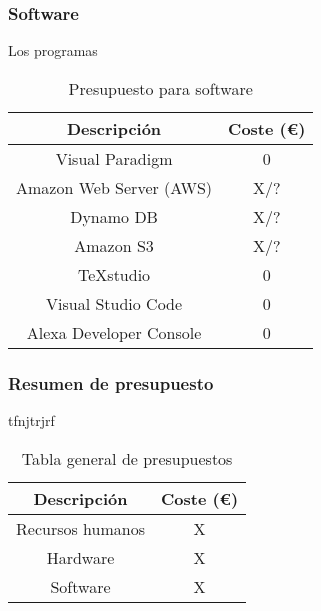 \subsubsection{Software}
Los programas 

\begin{table}[H]
    \centering
    \begin{tabular}{|c|c|}
    \hline
    \rowcolor{lightgray}
    \textbf{Descripción} & \textbf{Coste (€)}\\
    \hline
    Visual Paradigm & 0 \\
    \hline
    Amazon Web Server (AWS) & X/? \\
    \hline
    Dynamo DB & X/? \\
    \hline
    Amazon S3 & X/? \\
    \hline
    TeXstudio & 0 \\
    \hline
    Visual Studio Code & 0 \\
    \hline
    Alexa Developer Console & 0 \\
    \hline
    \end{tabular}
    \caption{Presupuesto para software}
    \label{tab:presupuesto-sw}
\end{table}

\subsubsection{Resumen de presupuesto}
tfnjtrjrf

\begin{table}[H]
    \centering
    \begin{tabular}{|c|c|}
        \hline
        \rowcolor{lightgray}
        \textbf{Descripción} & \textbf{Coste (€)} \\
        \hline
        Recursos humanos & X \\
        \hline
        Hardware & X \\
        \hline
        Software & X \\
        \hline
    \end{tabular}
    \caption{Tabla general de presupuestos}
    \label{tab:presupuesto-total}
\end{table}
